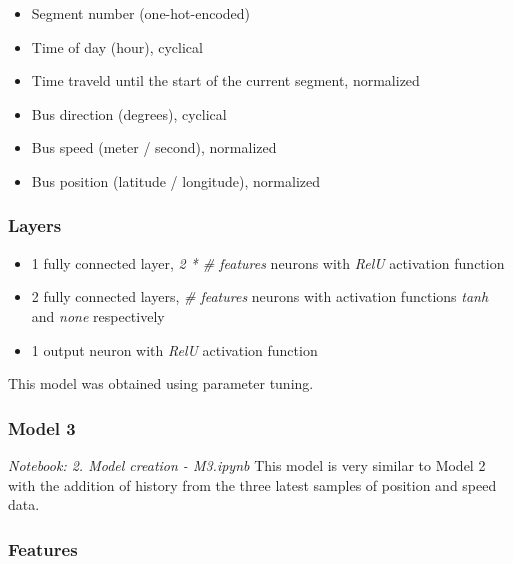 \begin{itemize}
    \item Segment number (one-hot-encoded)
    \item Time of day (hour), cyclical
    \item Time traveld until the start of the current segment, normalized
    \item Bus direction (degrees), cyclical
    \item Bus speed (meter / second), normalized
    \item Bus position (latitude / longitude), normalized
\end{itemize}
  

\subsubsection{Layers}

\begin{itemize}
    \item 1 fully connected layer, \textit{2 * \# features} neurons with \textit{RelU} activation function
    \item 2 fully connected layers, \textit{\# features} neurons with activation functions \textit{tanh} and \textit{none} respectively
    \item 1 output neuron with \textit{RelU} activation function
\end{itemize}

This model was obtained using parameter tuning.

\subsubsection{Model 3}\label{M3}
\textit{Notebook: 2. Model creation - M3.ipynb}
\newline
\noindent This model is very similar to Model 2 with the addition of history from the three latest samples of position and speed data.

\subsubsection{Features}

